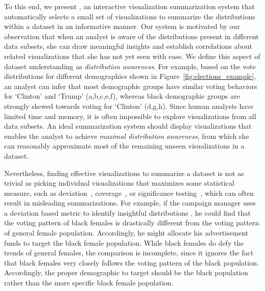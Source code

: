\par To this end, we present \system, an interactive visualization summarization system that automatically selects a small set of visualizations to summarize the distributions within a dataset in an informative manner. Our system is motivated by our observation that when an analyst is aware of the distributions present in different data subsets, she can draw meaningful insights and establish correlations about related visualizations that she has not yet seen with ease. We define this aspect of dataset understanding as \emph{distribution awareness}. For example, based on the vote distributions for different demographics shown in Figure~\ref{fig:elections_example}, an analyst can infer that most demographic groups have similar voting behaviors for `Clinton' and `Trump' (a,b,c,e,f), whereas black demographic groups are strongly skewed towards voting for `Clinton' (d,g,h). Since human analysts have limited time and memory, it is often impossible to explore visualizations from all data subsets. An ideal summarization system should display visualizations that enables the analyst to achieve \emph{maximal distribution awareness}, from which she can reasonably approximate most of the remaining unseen visualizations in a dataset.

\par Nevertheless, finding effective visualizations to summarize a dataset is not as trivial as picking individual visualizations that maximizes some statistical measure, such as deviation~\cite{Vartak2015}, coverage~\cite{Sarvghad2017}, or significance testing~\cite{Anand2015}, which can often result in misleading summarizations. For example, if the campaign manager uses a deviation based metric to identify insightful distributions \cite{Vartak2015}, he could find that the voting pattern of black females is drastically different from the voting pattern of general female population. Accordingly, he might allocate his advertisement funds to target the black female population. While black females do defy the trends of general females, the comparison is incomplete, since it ignores the fact that black females very closely follows the voting pattern of the black population. Accordingly, the proper demographic to target should be the black population rather than the more specific black female population.


